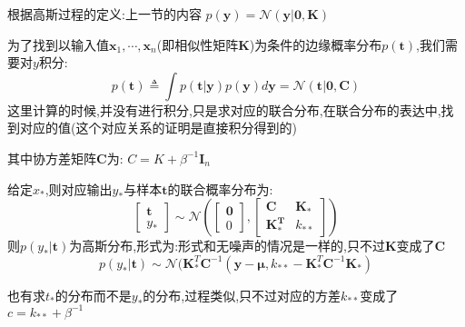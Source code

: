 \documentclass[UTF8,a4paper]{ctexart}
\begin{document}
            根据高斯过程的定义:{\color{blue}上一节的内容}
            $p(\bm y) = \mathcal N(\bm y | \bm 0,\bm K)$

            为了找到以输入值$\bm x_1 , \cdots,\bm x_n$(即相似性矩阵$\bm K$)为条件的边缘概率分布$p(\bm t)$,我们需要对$y$积分:
            \begin{equation}
                p(\bm t) \triangleq \int p(\bm t|\bm y)p(\bm y)d\bm y = \mathcal{N}(\bm t|\bm 0,\bm C)
            \end{equation}
            {\color{blue}这里计算的时候,并没有进行积分,只是求对应的联合分布,在联合分布的表达中,找到对应的值(这个对应关系的证明是直接积分得到的)}

            其中协方差矩阵$\bm C$为:
            $C = K + \beta^{-1}\bm I_n$

            给定$x_*$,则对应输出$y_*$与样本$\bm t$的联合概率分布为:
            \begin{equation}
                \left [ \begin{array}{c}
                    \bm{t} \\ y_*
                \end{array} \right ] \sim \mathcal{N}
                \left (
                    \left [\begin{array}{c}
                    \bm{0} \\ 0
                    \end{array} \right ] ,
                    \left [\begin{array}{cc}
                    \bm{C} & \bm{K_*} \\
                    \bm{K_*^T} & k_{**}
                    \end{array} \right ]
                \right )
            \end{equation}
            则$p(y_*|\bm t)$为高斯分布,形式为:{\color{blue}形式和无噪声的情况是一样的,只不过$\bm K$变成了$\bm C$}
            \begin{equation}
                p(y_*|\bm t) \sim \mathcal N (\bm K_*^T\bm C^{-1}(\bm y - \bm \mu,k_{**} - \bm K_*^T\bm C^{-1}\bm K_*)
            \end{equation}

            {\color{blue}也有求$t_*$的分布而不是$y_*$的分布,过程类似,只不过对应的方差$k_{**}$变成了$c = k_{**} + \beta^{-1}$}
\end{document}
